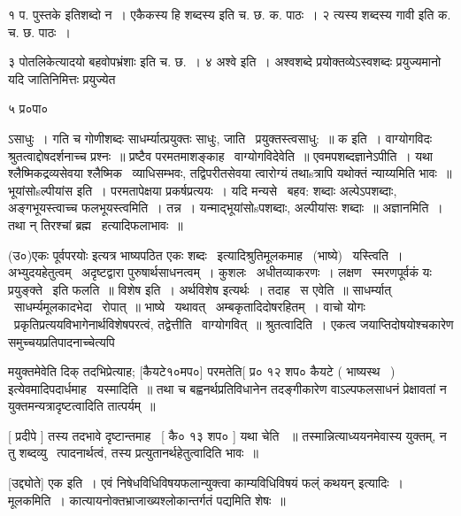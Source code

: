 \documentclass[11pt, openany]{book}
\begin{document}
१ प. पुस्तके इतिशब्दो न~। एकैकस्य हि शब्दस्य इति च. छ. क. पाठः~। २
{\qt त्यस्य शब्दस्य गावी} इति क. च. छ. पाठः~। 

३ {\qt पोतलिकेत्यादयो} बहवोपभ्रंशाः इति च. छ.~। ४ अश्वे इति~। अश्वशब्दे
प्रयोक्तव्येऽस्वशब्दः प्रयुज्यमानो यदि जातिनिमित्तः प्रयुज्येत 

५ प्र०पा० 





ऽसाधुः~। गति च गोणीशब्दः साधर्म्यात्प्रयुक्तः साधुः, जाति \textendash\ 
प्रयुक्तस्त्वसाधु:~॥ क इति~। वाग्योगविदः श्रुतत्वाद्दोषदर्शनाच्च
प्रश्नः~॥ प्रष्टैव परमतमाशङ्काह \textendash\ वाग्योगविदेवेति~॥
एवमपशब्दज्ञानेऽपीति~। यथा श्लैष्मिकद्रव्यसेवया श्लैष्मिक \textendash\ 
व्याधिसम्भवः, तद्विपरीतसेवया त्वारोग्यं तथाsत्रापि यथोक्तं न्याय्यमिति
भावः~॥ भूयांसोsल्पीयांस इति~। परमतापेक्षया प्रकर्षप्रत्ययः~। यदि
मन्यसे \textendash\ बहव: शब्दाः अल्पेऽपशब्दाः, अङ्गभूयस्त्वाच्च
फलभूयस्त्वमिति~। तन्न~। यन्माद्भूयांसोsपशब्दाः, अल्पीयांसः शब्दाः~॥
अज्ञानमिति~। तथा न् तिरश्चां ब्रह्म \textendash\ हत्यादिफलाभावः~॥ 

 (उ०){\qt एकः पूर्वपरयोः} इत्यत्र भाष्यपठित एकः शब्दः \textendash\ 
इत्यादिश्रुतिमूलकमाह \textendash\ (भाष्ये) \textendash\ यस्त्विति~। अभ्युदयहेतुत्वम् \textendash\ 
अदृष्टद्वारा पुरुषार्थसाधनत्वम्~। कुशलः \textendash\ अधीतव्याकरणः~। लक्षण \textendash\ 
स्मरणपूर्वकं यः प्रयुङ्क्ते \textendash\ इति फलति~॥ विशेष इति~। अर्थविशेष इत्यर्थः~। 
तदाह \textendash\ स एवेति~॥ साधर्म्यात् \textendash\ साधर्म्यमूलकादभेदा \textendash\ रोपात्~॥
भाष्ये \textendash\ यथावत् \textendash\ अम्बकृतादिदोषरहितम्~। वाचो योगः \textendash\ 
प्रकृतिप्रत्ययविभागेनार्थविशेषपरत्वं, तद्वेत्तीति \textendash\ वाग्योगवित्~॥
श्रुतत्वादिति~। एकत्व जयाप्तिदोषयोश्चकारेण समुच्चयप्रतिपादनाच्चेत्यपि



मयुक्तमेवेति दिक् तदभिप्रेत्याह; [कैयटे१०मप०] परमतेति[ प्र० १२
शप० कैयटे ( भाष्यस्थ \textendash\ ) {\qt इत्येवमादि}पदार्धमाह \textendash\ यस्मादिति~॥ तथा च
बह्वनर्थप्रतिविधानेन तदङ्गीकारेण वाऽल्पफलसाधनं प्रेक्षावतां न
युक्तमन्यत्रादृष्टत्वादिति तात्पर्यम्~॥ 

 [ प्रदीपे ] तस्य तदभावे दृष्टान्तमाह \textendash\ [ कै० १३ शप० ] यथा चेति
~॥ तस्मान्नित्याध्ययनमेवास्य युक्तम्, न तु शब्दव्यु \textendash\ त्पादनार्थत्वं,
तस्य प्रत्युतानर्थहेतुत्वादिति भावः~॥ 

 [उद्द्योते] एक इति~। {\qt एवं निषेधविधिविषयफलान्युक्त्वा
काम्यविधिविषयं फल्ं कथयन्} इत्यादिः~। मूलकमिति~। 
कात्यायनोक्तभ्राजाख्यश्लोकान्तर्गतं पद्यमिति शेषः~॥ 
\end{document}
